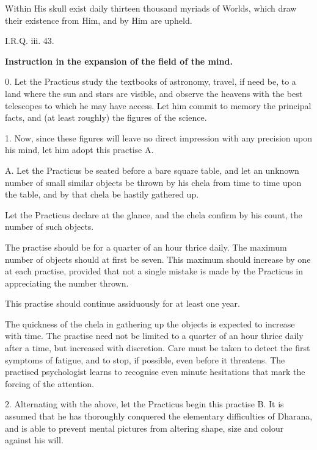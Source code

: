 
\epigraph{Within His skull exist daily thirteen thousand myriads of Worlds, which draw their existence from Him, and by Him are upheld.}{I.R.Q. iii. 43.}

\textbf{Instruction in the expansion of the field of the mind.}


0. Let the Practicus study the textbooks of astronomy, travel, if need be, to a land where the sun and stars are visible, and observe the heavens with the best telescopes to which he may have access. Let him commit to memory the principal facts, and (at least roughly) the figures of the science.

1. Now, since these figures will leave no direct impression with any precision upon his mind, let him adopt this practise A.

     
\begin{quoting}

A. Let the Practicus be seated before a bare square table, and let an unknown number of small similar objects be thrown by his chela from time to time upon the table, and by that chela be hastily gathered up.

Let the Practicus declare at the glance, and the chela confirm by his count, the number of such objects.

The practise should be for a quarter of an hour thrice daily. The maximum number of objects should at first be seven. This maximum should increase by one at each practise, provided that not a single mistake is made by the Practicus in appreciating the number thrown.
     
This practise should continue assiduously for at least one year.

The quickness of the chela in gathering up the objects is expected to increase with time. The practise need not be limited to a quarter of an hour thrice daily after a time, but increased with discretion. Care must be taken to detect the first symptoms of fatigue, and to stop, if possible, even before it threatens. The practised psychologist learns to recognise even minute hesitations that mark the forcing of the attention.

\end{quoting}


2. Alternating with the above, let the Practicus begin this practise B. It is assumed that he has thoroughly conquered the elementary difficulties of Dharana, and is able to prevent mental pictures from altering shape, size and colour against his will.
 

